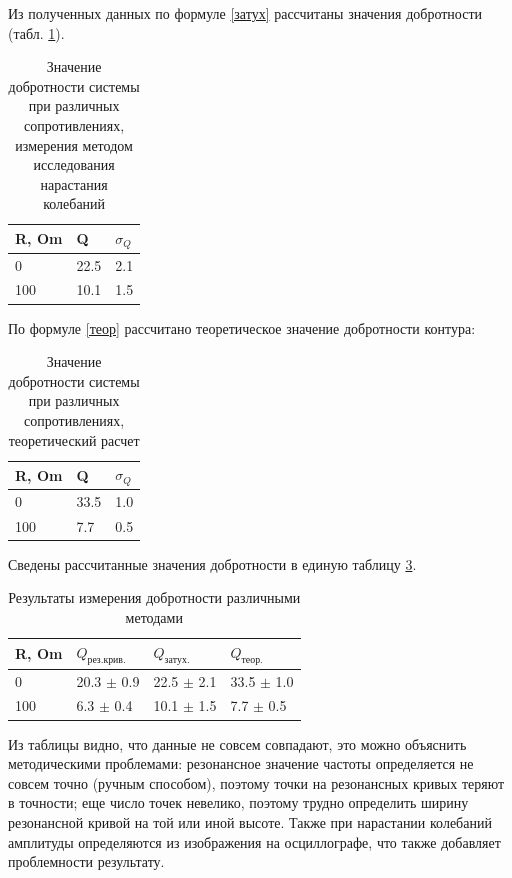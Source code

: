 \documentclass[a4paper,12pt]{article} %
\begin{document}
Из полученных данных по формуле \ref{затух} рассчитаны значения добротности (табл. \ref{затух_тбл}).
\begin{table}[h!]
\caption{Значение добротности системы при различных сопротивлениях, измерения методом исследования нарастания колебаний}
\label{затух_тбл}
\begin{tabular}{|l|l|l|}
\hline
R, Om & Q     & $\sigma_Q$ \\ \hline
0     & 22.5 & 2.1       \\ \hline
100   & 10.1 & 1.5       \\ \hline
\end{tabular}
\end{table}

По формуле \ref{теор} рассчитано теоретическое значение добротности контура:
\begin{table}[h!]
\caption{Значение добротности системы при различных сопротивлениях, теоретический расчет}
\label{теор_тбл}
\begin{tabular}{|l|l|l|}
\hline
R, Om & Q     & $\sigma_Q$ \\ \hline
0     & 33.5 & 1.0       \\ \hline
100   & 7.7 & 0.5       \\ \hline
\end{tabular}
\end{table}

Сведены рассчитанные значения добротности в единую таблицу \ref{един}.
\begin{table}[h!]
\caption{Результаты измерения добротности различными методами}
\label{един}
\begin{tabular}{|l|l|l|l|}
\hline
R, Om & $Q_{рез.крив.}$  & $Q_{затух.}$     & $Q_{теор.}$      \\ \hline
0     & 20.3 $\pm$ 0.9 & 22.5 $\pm$ 2.1 & 33.5 $\pm$ 1.0\\ \hline
100   & 6.3 $\pm$ 0.4  & 10.1 $\pm$ 1.5 & 7.7 $\pm$ 0.5    \\ \hline
\end{tabular}
\end{table}

Из таблицы видно, что данные не совсем совпадают, это можно объяснить методическими проблемами: резонансное значение частоты определяется не совсем точно (ручным способом), поэтому точки на резонансных кривых теряют в точности; еще число точек невелико, поэтому трудно определить ширину резонансной кривой на той или иной высоте. Также при нарастании колебаний амплитуды определяются из изображения на осциллографе, что также добавляет проблемности результату.
\end{document}
